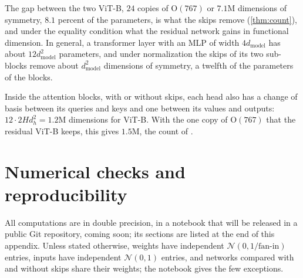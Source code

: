 \documentclass[10pt]{article}
\theoremstyle{definition}
\theoremstyle{remark}
\newcommand{\dm}{d_{\mathrm{model}}}
\newcommand{\Ort}{\mathrm{O}}
\begin{document}
The gap between the two ViT-B, $24$ copies of $\Ort(767)$ or $7.1$M dimensions of symmetry, $8.1$ percent of the parameters, is what the skips remove (\cref{thm:count}), and under the equality condition what the residual network gains in functional dimension. In general, a transformer layer with an MLP of width $4\dm$ has about $12\dm^2$ parameters, and under normalization the skips of its two sub-blocks remove about $\dm^2$ dimensions of symmetry, a twelfth of the parameters of the blocks.

Inside the attention blocks, with or without skips, each head also has a change of basis between its queries and keys and one between its values and outputs: $12 \cdot 2Hd_h^2 = 1.2$M dimensions for ViT-B. With the one copy of $\Ort(767)$ that the residual ViT-B keeps, this gives $1.5$M, the count of \citet[Eq.~17]{vannierop2024gauge}.

\FloatBarrier
\section{Numerical checks and reproducibility}\label{app:checks}

All computations are in double precision, in a notebook that will be released in a public Git repository, coming soon; its sections are listed at the end of this appendix. Unless stated otherwise, weights have independent $\mathcal N(0, 1/\text{fan-in})$ entries, inputs have independent $\mathcal N(0, 1)$ entries, and networks compared with and without skips share their weights; the notebook gives the few exceptions.
\end{document}
